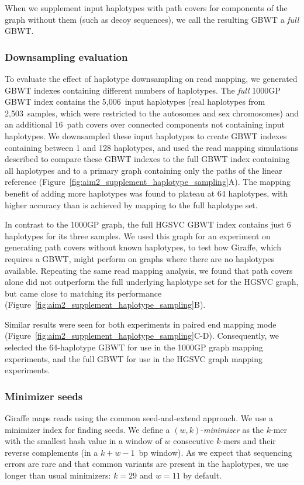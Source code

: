 \documentclass[11pt]{ucscthesis}
\newcommand{\vocab}[1]{\emph{#1}}
\begin{document}
When we supplement input haplotypes with path covers for components of the graph without them (such as decoy sequences), we call the resulting GBWT a \vocab{full} GBWT.

\subsubsection{Downsampling evaluation}
\label{subsec:aim2:downsamplingeval}

To evaluate the effect of haplotype downsampling on read mapping, we generated GBWT indexes containing different numbers of haplotypes.
The \vocab{full} 1000GP GBWT index contains the 5,006~input haplotypes (real haplotypes from 2,503~samples, which were restricted to the autosomes and sex chromosomes) and an additional 16~path covers over connected components not containing input haplotypes.
We downsampled these input haplotypes to create GBWT indexes containing between 1 and 128 haplotypes, and used the read mapping simulations described to compare these GBWT indexes to the full GBWT index containing all haplotypes and to a primary graph containing only the paths of the linear reference (Figure~\ref{fig:aim2_supplement_haplotype_sampling}A).
The mapping benefit of adding more haplotypes was found to plateau at 64 haplotypes, with higher accuracy than is achieved by mapping to the full haplotype set.

In contrast to the 1000GP graph, the full HGSVC GBWT index contains just 6 haplotypes for its three samples. We used this graph for an experiment on generating path covers without known haplotypes, to test how Giraffe, which requires a GBWT, might perform on graphs where there are no haplotypes available. Repeating the same read mapping analysis, we found that path covers alone did not outperform the full underlying haplotype set for the HGSVC graph, but came close to matching its performance (Figure~\ref{fig:aim2_supplement_haplotype_sampling}B).

Similar results were seen for both experiments in paired end mapping mode (Figure~\ref{fig:aim2_supplement_haplotype_sampling}C-D). Consequently, we selected the 64-haplotype GBWT for use in the 1000GP graph mapping experiments, and the full GBWT for use in the HGSVC graph mapping experiments.


\subsubsection{Minimizer seeds}
\label{subsec:aim2:minimizers}
Giraffe maps reads using the common seed-and-extend approach.
We use a minimizer index \cite{Roberts2004} for finding seeds.
We define a $(w,k)$-\vocab{minimizer} as the $k$-mer with the smallest hash value in a window of $w$ consecutive $k$-mers and their reverse complements (in a $k+w-1$~bp window).
As we expect that sequencing errors are rare and that common variants are present in the haplotypes, we use longer than usual minimizers: $k = 29$ and $w = 11$ by default.
\end{document}

